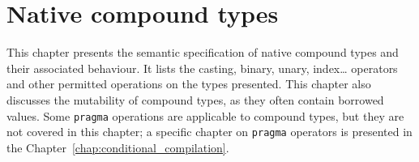 \chapter{Native compound types}
\pagecolor{gray!10!white}
\label{chap:compound}

This chapter presents the semantic specification of native compound types and
their associated behaviour. It lists the casting, binary, unary, index\ldots
operators and other permitted operations on the types presented. This chapter
also discusses the mutability of compound types, as they often contain borrowed
values. Some \texttt{pragma} operations are applicable to compound types, but
they are not covered in this chapter; a specific chapter on \texttt{pragma}
operators is presented in the Chapter~\ref{chap:conditional_compilation}.

\minitoc%

